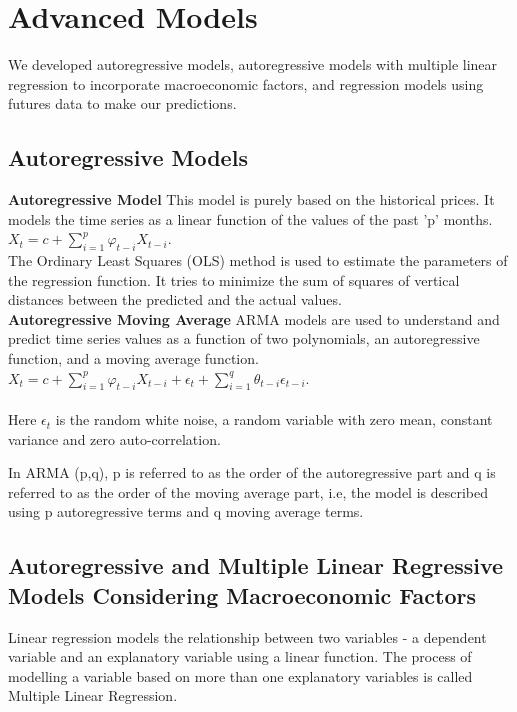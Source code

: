 \documentclass[runningheads]{llncs}
\begin{document}
\section{Advanced Models}

We developed autoregressive models, autoregressive models with multiple linear regression to incorporate macroeconomic factors, and regression models using futures data to make our predictions. \\

\subsection{Autoregressive Models}
\noindent\textbf{Autoregressive Model} This model is purely based on the historical prices. It models the time series as a linear function of the values of the past 'p' months.\\

$ X_{t} = c + \sum\limits_{i=1}^p \varphi_{t-i}X_{t-i}$. \\

\noindent The Ordinary Least Squares (OLS) method is used to estimate the parameters of the regression function. It tries to minimize the sum of squares of vertical distances between the predicted and the actual values. \\

\noindent\textbf{Autoregressive Moving Average} ARMA models are used to understand and predict time series values as a function of two polynomials, an autoregressive function, and a moving average function. 
\\

$ X_{t} = c + \sum\limits_{i=1}^p \varphi_{t-i}X_{t-i} + \epsilon_{t} + \sum\limits_{i=1}^q \theta_{t-i}\epsilon_{t-i}$.\\\\

\noindent Here $\epsilon_t$ is the random white noise, a random variable with zero mean, constant variance and zero auto-correlation.

\noindent In ARMA (p,q), p is referred to as the order of the autoregressive part and q is referred to as the order of the moving average part, i.e, the model is described using p autoregressive terms and q moving average terms.\\ 

\subsection{Autoregressive and Multiple Linear Regressive Models Considering Macroeconomic Factors}
Linear regression models the relationship between two variables - a dependent variable and an explanatory variable using a linear function. The process of modelling a variable based on more than one explanatory variables is called Multiple Linear Regression. \\
   
\end{document}

